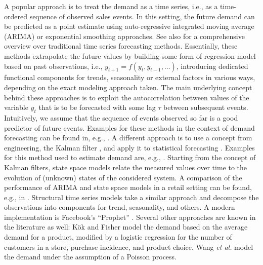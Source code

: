 \documentclass[BCOR=1mm, DIV=calc,10pt,
twoside=true,
twocolumn,
headings=normal]{scrartcl}
\newcommand{\etal}{ {\em et al.}}
\begin{document}
A popular approach is to treat the demand as a time series, i.e., as a time-ordered sequence of observed sales events. In this setting, the future demand can be predicted as a point estimate using auto-regressive integrated moving average (ARIMA) \cite{BoxJenkins} or exponential smoothing \cite{croston1972forecasting, holt1957forecasting, Brown1963, Gardner1985} approaches. See also \cite{deGooijerHyndman2006} for a comprehensive overview over traditional time series forecasting methods. Essentially, these methods extrapolate the future values by building some form of regression model based on past observations, i.e., $y_{t+1} = f(y_t, y_{t-1}, \ldots)$, introducing dedicated functional components for trends, seasonality or external factors in various ways, depending on the exact modeling approach taken. The main underlying concept behind these approaches is to exploit the autocorrelation between values of the variable $y_t$ that is to be forecasted with some lag $\tau$ between subsequent events. Intuitively, we assume that  the sequence of events observed so far is a good predictor of future events. Examples for these methods in the context of demand forecasting can be found in, e.g., \cite{huber2017cluster, kalchschmidt2006forecasting, fattah2018forecasting, permatasari2018sales}.  A different approach is to use a concept from engineering, the Kalman filter \cite{kalman1960new}, and apply it to statistical forecasting \cite{morrison1977kalman}. Examples for this method used to estimate demand are, e.g., \cite{mitropoulos1980using, tegene1991kalman, kandananond2014applying,jacobi2007water}. Starting from the concept of Kalman filters, state space models \cite{hyndman2008forecasting} relate the measured values over time to the evolution of (unknown) states of the considered system. A comparison of the performance of ARIMA and state space models in a retail setting can be found, e.g., in \cite{ramos2015performance}. Structural time series models \cite{StructuralTS} take a similar approach and decompose the observations into components for trend, seasonality, and others. A modern implementation is Facebook's ``Prophet''  \cite{taylor2018forecasting}. Several other approaches are known in the literature as well: K\"ok and Fisher \cite{kok2007demand} model the demand based on the average demand for a product, modified by a logistic regression for the number of customers in a store, purchase incidence, and product choice. Wang \etal \cite{wang2005demand} model the demand under the assumption of a Poisson process.
\end{document}
